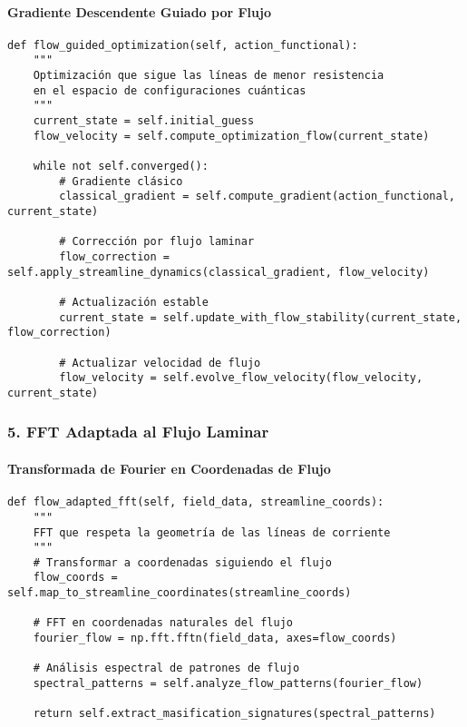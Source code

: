 \documentclass{book}
\begin{document}
\paragraph*{Gradiente Descendente Guiado por Flujo}
\begin{verbatim}
def flow_guided_optimization(self, action_functional):
    """
    Optimización que sigue las líneas de menor resistencia
    en el espacio de configuraciones cuánticas
    """
    current_state = self.initial_guess
    flow_velocity = self.compute_optimization_flow(current_state)

    while not self.converged():
        # Gradiente clásico
        classical_gradient = self.compute_gradient(action_functional, current_state)

        # Corrección por flujo laminar
        flow_correction = self.apply_streamline_dynamics(classical_gradient, flow_velocity)

        # Actualización estable
        current_state = self.update_with_flow_stability(current_state, flow_correction)

        # Actualizar velocidad de flujo
        flow_velocity = self.evolve_flow_velocity(flow_velocity, current_state)
\end{verbatim}
\subsubsection*{5. FFT Adaptada al Flujo Laminar}
\paragraph*{Transformada de Fourier en Coordenadas de Flujo}
\begin{verbatim}
def flow_adapted_fft(self, field_data, streamline_coords):
    """
    FFT que respeta la geometría de las líneas de corriente
    """
    # Transformar a coordenadas siguiendo el flujo
    flow_coords = self.map_to_streamline_coordinates(streamline_coords)

    # FFT en coordenadas naturales del flujo
    fourier_flow = np.fft.fftn(field_data, axes=flow_coords)

    # Análisis espectral de patrones de flujo
    spectral_patterns = self.analyze_flow_patterns(fourier_flow)

    return self.extract_masification_signatures(spectral_patterns)
\end{verbatim}
\end{document}
